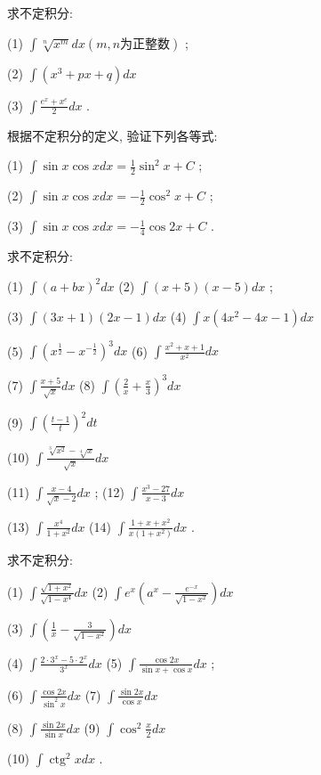 \documentclass[lang=cn,newtx,12pt,scheme=chinese]{elegantbook}
\begin{document}
\begin{problemset}[习 题 十 三]

\item 求不定积分:

(1) \(\int \sqrt[n]{{x}^{m}}{dx}\left( {m,n\text{为正整数}}\right)\) ;

(2) \(\int \left( {{x}^{3} + {px} + q}\right) {dx}\)

(3) \(\int \frac{{e}^{x} + {x}^{e}}{2}{dx}\) .

\item 根据不定积分的定义, 验证下列各等式:

(1) \(\int \sin x\cos {xdx} = \frac{1}{2}{\sin }^{2}x + C\) ;

(2) \(\int \sin x\cos {xdx} = - \frac{1}{2}{\cos }^{2}x + C\) ;

(3) \(\int \sin x\cos {xdx} = - \frac{1}{4}\cos {2x} + C\) .

\item 求不定积分:

(1) \(\int {\left( a + bx\right) }^{2}{dx}\) (2) \(\int \left( {x + 5}\right) \left( {x - 5}\right) {dx}\) ;

(3) \(\int \left( {{3x} + 1}\right) \left( {{2x} - 1}\right) {dx}\) (4) \(\int x\left( {4{x}^{2} - {4x} - 1}\right) {dx}\)

(5) \(\int {\left( {x}^{\frac{1}{2}} - {x}^{-\frac{1}{2}}\right) }^{3}{dx}\) (6) \(\int \frac{{x}^{2} + x + 1}{{x}^{2}}{dx}\)

(7) \(\int \frac{x + 5}{\sqrt{x}}{dx}\) (8) \(\int {\left( \frac{2}{x} + \frac{x}{3}\right) }^{3}{dx}\)

(9) \(\int {\left( \frac{t - 1}{t}\right) }^{2}{dt}\)

(10) \( \int \frac{\sqrt[3]{x^{2}}-\sqrt[4]{x}}{\sqrt{x}} {d x}\)

(11) \(\int \frac{x - 4}{\sqrt{x} - 2}{dx}\) ; (12) \(\int \frac{{x}^{3} - {27}}{x - 3}{dx}\)

(13) \(\int \frac{{x}^{4}}{1 + {x}^{2}}{dx}\) (14) \(\int \frac{1 + x + {x}^{2}}{x\left( {1 + {x}^{2}}\right) }{dx}\) .

\item 求不定积分:

(1) \(\int \frac{\sqrt{1 + {x}^{2}}}{\sqrt{1 - {x}^{4}}}{dx}\) (2) \(\int {e}^{x}\left( {{a}^{x} - \frac{{e}^{-x}}{\sqrt{1 - {x}^{2}}}}\right) {dx}\)

(3) \(\int \left( {\frac{1}{x} - \frac{3}{\sqrt{1 - {x}^{2}}}}\right) {dx}\)

(4) \(\int \frac{2 \cdot {3}^{x} - 5 \cdot {2}^{x}}{{3}^{x}}{dx}\) (5) \(\int \frac{\cos {2x}}{\sin x + \cos x}{dx}\) ;

(6) \(\int \frac{\cos {2x}}{{\sin }^{2}x}{dx}\) (7) \(\int \frac{\sin {2x}}{\cos x}{dx}\)

(8) \(\int \frac{\sin {2x}}{\sin x}{dx}\) (9) \(\int {\cos }^{2}\frac{x}{2}{dx}\)

(10) \(\int {\operatorname{ctg}}^{2}{xdx}\) .

\end{problemset}
\end{document}
